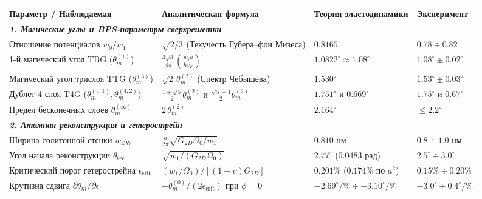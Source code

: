 \documentclass[12pt,a4paper]{article}
\begin{document}
\begin{table}[H]
	\centering
	\footnotesize
	\setlength{\tabcolsep}{3pt}
	\renewcommand{\arraystretch}{1.25}
	\begin{tabularx}{\textwidth}{p{3.4cm} p{5.2cm} p{3.8cm} >{\raggedleft\arraybackslash}X}
		\toprule
		\textbf{Параметр / Наблюдаемая} & \textbf{Аналитическая формула} & \textbf{Теория эластодинамики} & \textbf{Эксперимент} \\
		\midrule
		\multicolumn{4}{l}{\textit{\textbf{1. Магические углы и BPS-параметры сверхрешетки}}} \\
		Отношение потенциалов $w_0/w_1$ & $\sqrt{2/3}$ (Текучесть Губера--фон Мизеса) & $\mathbf{0.8165}$ & $0.78 \div 0.82$ \\
		1-й магический угол TBG ($\theta_m^{(1)}$) & $\frac{3\sqrt{3}}{4\pi} (\frac{w_1 a}{\hbar v_F})$ & $\mathbf{1.0822^\circ \approx 1.08^\circ}$ & $1.08^\circ \pm 0.02^\circ$ \\
		Магический угол трислоя TTG ($\theta_m^{(3)}$) & $\sqrt{2} \, \theta_m^{(2)}$ (Спектр Чебышёва) & $\mathbf{1.530^\circ}$ & $1.53^\circ \pm 0.03^\circ$ \\
		Дублет 4-слоя T4G ($\theta_m^{(4,1)}, \theta_m^{(4,2)}$) & $\frac{1+\sqrt{5}}{2}\theta_m^{(2)}$ и $\frac{\sqrt{5}-1}{2}\theta_m^{(2)}$ & $\mathbf{1.751^\circ} \text{ и } \mathbf{0.669^\circ}$ & $1.75^\circ \text{ и } 0.67^\circ$ \\
		Предел бесконечных слоев $\theta_m^{(\infty)}$ & $2 \, \theta_m^{(2)}$ & $\mathbf{2.164^\circ}$ & $\le 2.2^\circ$ \\
		\midrule
		\multicolumn{4}{l}{\textit{\textbf{2. Атомная реконструкция и гетерострейн}}} \\
		Ширина солитонной стенки $w_{\text{DW}}$ & $\frac{a}{2\pi}\sqrt{G_{2D}\Omega_0 / w_1}$ & $\mathbf{0.810\text{ нм}}$ & $0.8 \div 1.0\text{ нм}$ \\
		Угол начала реконструкции $\theta_{\text{rec}}$ & $\sqrt{w_1 / (G_{2D}\Omega_0)}$ & $\mathbf{2.77^\circ}$ ($0.0483\text{ рад}$) & $2.5^\circ \div 3.0^\circ$ \\
		Критический порог гетерострейна $\epsilon_{\text{crit}}$ & $(w_1 / \Omega_0) / [(1+\nu) G_{2D}]$ & $\mathbf{0.201\%}$ ($0.174\%$ по $a^2$) & $0.15\% \div 0.20\%$ \\
		Крутизна сдвига $\partial\theta_m / \partial\epsilon$ & $-\theta_m^{(0)} / (2\epsilon_{\text{crit}})$ при $\phi=0$ & $\mathbf{-2.69^\circ / \%} \div \mathbf{-3.10^\circ / \%}$ & $-3.0^\circ \pm 0.4^\circ / \%$ \\

\end{tabularx}
\end{table}
\end{document}
